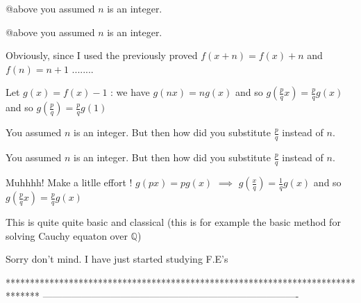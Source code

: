 \begin{solution}
	@above you assumed $n$ is an integer.
\end{solution}



\begin{solution}
	\begin{tcolorbox}@above you assumed $n$ is an integer.\end{tcolorbox}

Obviously, since I used the previously proved $f(x+n)=f(x)+n$ and $f(n)=n+1$ ........
\end{solution}



\begin{solution}
	\begin{tcolorbox}
Let $g(x)=f(x)-1$ : we have $g(nx)=ng(x)$ and so $g(\frac pqx)=\frac pqg(x)$ and so $g(\frac pq)=\frac pqg(1)$

\end{tcolorbox}

You assumed $n$ is an integer. But then how did you substitute $\frac{p}{q}$ instead of $n$.
\end{solution}



\begin{solution}
	\begin{tcolorbox}You assumed $n$ is an integer. But then how did you substitute $\frac{p}{q}$ instead of $n$.\end{tcolorbox}
Muhhhh! Make a litlle effort !
$g(px)=pg(x)$ $\implies$ $g(\frac xq)=\frac 1qg(x)$ and so $g(\frac pqx)=\frac pqg(x)$

This is quite quite basic and classical (this is for example the basic method for solving Cauchy equaton over $\mathbb Q$)



\end{solution}



\begin{solution}
	Sorry don't mind. I have just started studying F.E's
\end{solution}
*******************************************************************************
-------------------------------------------------------------------------------

